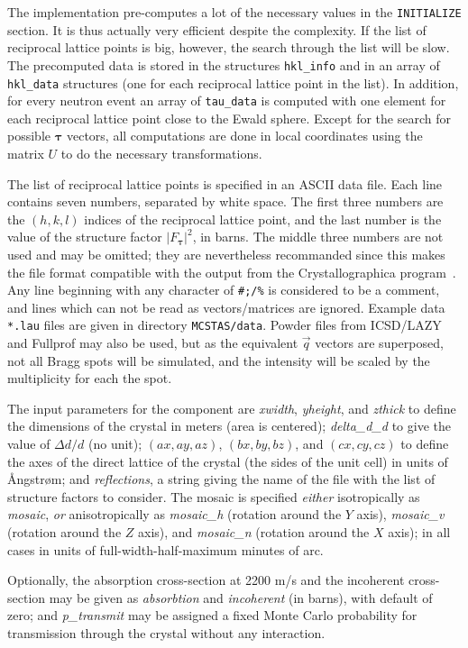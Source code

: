 The implementation pre-computes a lot of the necessary values in the
\texttt{INITIALIZE} section. It is thus actually very efficient despite
the complexity. If the list of reciprocal lattice points is big,
however, the search through the list will be slow. The precomputed data
is stored in the structures \texttt{hkl\_info} and in an array of
\texttt{hkl\_data} structures (one for each reciprocal lattice point in
the list). In addition, for every neutron event an array of
\texttt{tau\_data} is computed with one element for each reciprocal
lattice point close to the Ewald sphere. Except for the search for
possible $\boldsymbol{\tau}$ vectors, all computations are done in local
coordinates using the matrix $U$ to do the necessary transformations.

The list of reciprocal lattice points is specified in an ASCII data
file. Each line contains seven numbers, separated by white space. The
first three numbers are the $(h,k,l)$ indices of the reciprocal lattice
point, and the last number is the value of the structure factor
$|F_{\boldsymbol{\tau}}|^2$, in barns. The middle three numbers are not
used and may be omitted; they are nevertheless recommanded since this makes
the file format compatible with the output from the Crystallographica
program~\cite{crystallographica}.
Any line beginning with any character of \verb+#;/%+ is considered to be a
comment, and lines which can not be read as vectors/matrices are ignored.
Example data \verb+*.lau+ files are given in directory \verb+MCSTAS/data+.
Powder files from ICSD/LAZY \cite{icsd_ill} and Fullprof \cite{Fullprof}
may also be used, but as the equivalent $\vec q$ vectors are superposed, not
all Bragg spots will be simulated, and the intensity will be scaled by the
multiplicity for each the spot.

The input parameters for the component are \textit{xwidth},
\textit{yheight}, and \textit{zthick} to define the dimensions of the
crystal in meters (area is centered); \textit{delta\_d\_d} to give the
value of $\Delta d/d$ (no unit);
$(\textit{ax}, \textit{ay}, \textit{az})$, $(\textit{bx}, \textit{by},
\textit{bz})$, and $(\textit{cx}, \textit{cy}, \textit{cz})$ to define
the axes of the direct lattice of the crystal (the sides of the unit
cell) in units of {\AA}ngstr{\o}m; and \textit{reflections}, a string
giving the name of the file with the list of structure factors to
consider.
The mosaic is specified \emph{either} isotropically as
\textit{mosaic}, \emph{or} anisotropically as \textit{mosaic\_h}
(rotation around the $Y$ axis), \textit{mosaic\_v} (rotation around the
$Z$ axis), and \textit{mosaic\_n} (rotation around the $X$ axis); in all
cases in units of full-width-half-maximum minutes of arc.

Optionally, the absorption cross-section at 2200 m/s and the incoherent
cross-section may be given as \textit{absorbtion} and
\textit{incoherent} (in barns), with default of zero; and
\textit{p\_transmit} may be assigned a fixed Monte Carlo probability for
transmission through the crystal without any interaction.
